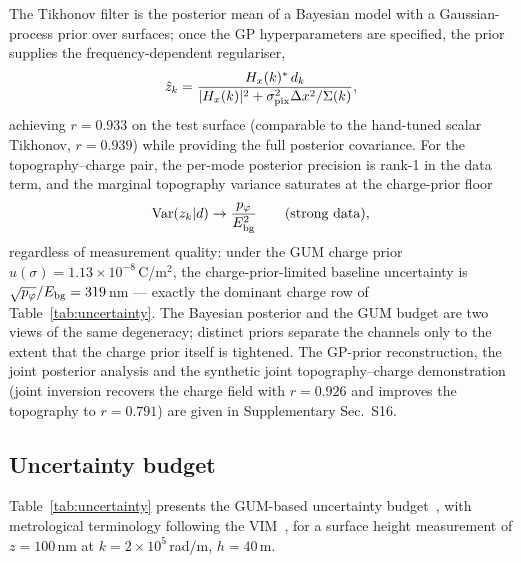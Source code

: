 \documentclass[12pt,a4paper]{article}
\begin{document}
The Tikhonov filter is the posterior mean of a Bayesian model with a
Gaussian-process prior over surfaces; once the GP hyperparameters are
specified, the prior supplies the frequency-dependent regulariser,
\begin{equation}
\hat z_k = \frac{H_x(k)^*\,d_k}{|H_x(k)|^2 + \sigma_{\rm pix}^2
\Delta x^2/\Sigma(k)},
\label{eq:bayesian_post}
\end{equation}
achieving $r=0.933$ on the test surface (comparable to the
hand-tuned scalar Tikhonov, $r=0.939$) while providing the full posterior
covariance.  For the topography--charge pair, the per-mode posterior
precision is rank-1 in the data term, and the marginal topography
variance saturates at the charge-prior floor
\begin{equation}
\operatorname{Var}(z_k|d)\to \frac{p_\varphi}{E_{\rm bg}^2}
\qquad\text{(strong data)},
\label{eq:joint_post_var}
\end{equation}
regardless of measurement quality: under the GUM charge prior
$u(\sigma)=1.13\times10^{-8}$\,C/m$^2$, the charge-prior-limited
baseline uncertainty is
$\sqrt{p_\varphi}/E_{\rm bg}=319$\,nm --- exactly the dominant charge row
of Table~\ref{tab:uncertainty}.  The Bayesian posterior and the GUM
budget are two views of the same degeneracy; distinct priors separate the
channels only to the extent that the charge prior itself is tightened.
The GP-prior reconstruction, the joint posterior analysis and the
synthetic joint topography--charge demonstration (joint inversion
recovers the charge field with $r=0.926$ and improves the topography to
$r=0.791$) are given in Supplementary Sec.~S16.

\subsection{Uncertainty budget}

Table~\ref{tab:uncertainty} presents the GUM-based uncertainty
budget~\cite{gum2008}, with metrological terminology following the
VIM~\cite{vim2012}, for a surface height measurement of $z=100$\,nm at
$k=2\times10^5$\,rad/m, $h=40$\,\textmu m.
\end{document}
